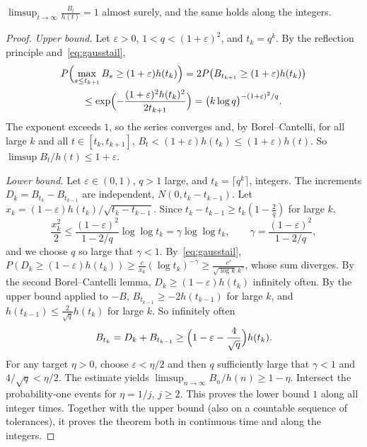 \begin{theorem}\label{thm:lilbm}
$\displaystyle\limsup_{t\to\infty}\frac{B_t}{h(t)}=1$ almost surely, and the same holds along the integers.
\end{theorem}
\begin{proof}
\emph{Upper bound.} Let $\varepsilon>0$, $1<q<(1+\varepsilon)^2$, and $t_k=q^k$. By the reflection principle and~\eqref{eq:gausstail},
\[
\begin{gathered}
P\Bigl(\max_{s\le t_{k+1}}B_s\ge(1+\varepsilon)h(t_k)\Bigr)=2P\bigl(B_{t_{k+1}}\ge(1+\varepsilon)h(t_k)\bigr)\\\le\exp\Bigl(-\frac{(1+\varepsilon)^2h(t_k)^2}{2t_{k+1}}\Bigr)=\bigl(k\log q\bigr)^{-(1+\varepsilon)^2/q}.
\end{gathered}
\]
The exponent exceeds $1$, so the series converges and, by Borel--Cantelli, for all large $k$ and all $t\in[t_k,t_{k+1}]$, $B_t<(1+\varepsilon)h(t_k)\le(1+\varepsilon)h(t)$. So
$\limsup B_t/h(t)\le1+\varepsilon$.

\emph{Lower bound.} Let $\varepsilon\in(0,1)$, $q>1$ large, and $t_k=\lceil q^k\rceil$, integers. The increments $D_k=B_{t_k}-B_{t_{k-1}}$ are independent, $N(0,t_k-t_{k-1})$. Let
$x_k=(1-\varepsilon)h(t_k)/\sqrt{t_k-t_{k-1}}$. Since $t_k-t_{k-1}\ge t_k(1-\frac2q)$ for large $k$,
\[
\frac{x_k^2}2\le\frac{(1-\varepsilon)^2}{1-2/q}\log\log t_k=\gamma\log\log t_k,\qquad\gamma=\frac{(1-\varepsilon)^2}{1-2/q},
\]
and we choose $q$ so large that $\gamma<1$. By~\eqref{eq:gausstail}, $P(D_k\ge(1-\varepsilon)h(t_k))\ge\frac c{x_k}(\log t_k)^{-\gamma}\ge\frac{c'}{\sqrt{\log k}\,k^\gamma}$, whose sum diverges. By the
second Borel--Cantelli lemma, $D_k\ge(1-\varepsilon)h(t_k)$ infinitely often. By the upper bound applied to $-B$, $B_{t_{k-1}}\ge-2h(t_{k-1})$ for large $k$, and $h(t_{k-1})\le
\frac2{\sqrt q}h(t_k)$ for large $k$. So infinitely often
\[
B_{t_k}=D_k+B_{t_{k-1}}\ge\Bigl(1-\varepsilon-\frac4{\sqrt q}\Bigr)h(t_k).
\]
For any target $\eta>0$, choose $\varepsilon<\eta/2$ and then $q$ sufficiently large that $\gamma<1$ and $4/\sqrt q<\eta/2$. The estimate yields $\limsup_{n\to\infty}B_n/h(n)\ge1-\eta$. Intersect the probability-one events for $\eta=1/j$, $j\ge2$. This proves the lower bound $1$ along all integer times. Together with the upper bound (also on a countable sequence of tolerances), it proves the theorem both in continuous time and along the integers.
\end{proof}

